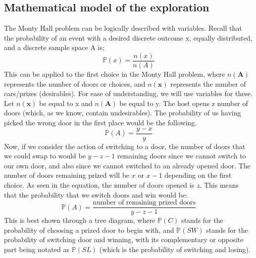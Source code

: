 \documentclass{article}
\begin{document}
\subsection*{Mathematical model of the exploration}
The Monty Hall problem can be logically described with variables. Recall that the probability of an event with a desired discrete outcome x, equally distributed, and a discrete sample space A is;
\begin{equation}
    \mathbb{P}(x)=\frac{n(x)}{n(A)}
\end{equation}
This can be applied to the first choice in the Monty Hall problem, where $n(\textbf{A})$ represents the number of doors or choices, and $n(\textbf{x})$ represents the number of cars/prizes (desirables). For ease of understanding, we will use variables for these. Let $n(\textbf{x})$ be equal to x and $n(\textbf{A})$ be equal to y. The host opens z number of doors (which, as we know, contain undesirables). The probability of us having picked the wrong door in the first place would be the following.
\begin{equation}
    \mathbb{P}(A)=\frac{y-x}{y}
\end{equation}
Now, if we consider the action of switching to a door, the number of doors that we could swap to would be $y-z-1$ remaining doors since we cannot switch to our own door, and also since we cannot switched to an already opened door. The number of doors remaining prized will be $x$ or $x-1$ depending on the first choice. As seen in the equation, the number of doors opened is $z$. This means that the probability that we switch doors and win would be:
\begin{equation}
    \mathbb{P}(A)=\frac{\text{number of remaining prized doors}}{y-z-1}
\end{equation}
This is best shown through a tree diagram, where $\mathbb{P}(C)$ stands for the probability of choosing a prized door to begin with, and $\mathbb{P}(SW)$ stands for the probability of switching door and winning, with its complementary or opposite part being notated as $\mathbb{P}(SL)$ (which is the probability of switching and losing).
\end{document}
